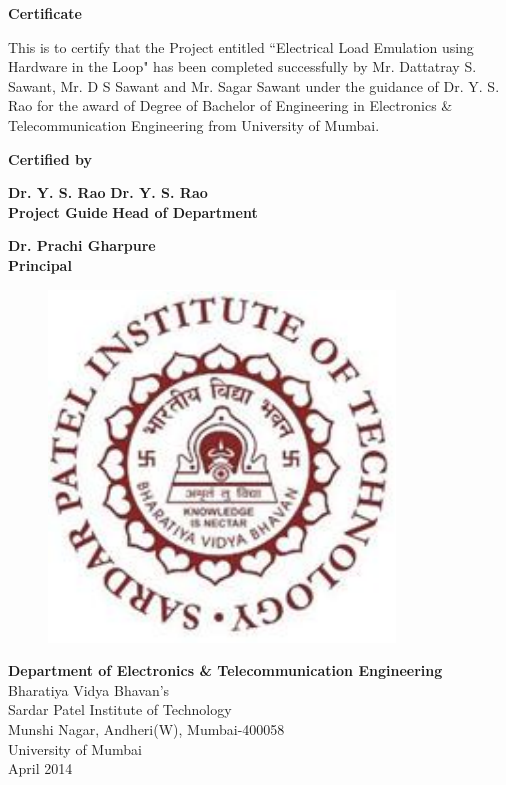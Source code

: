 \thispagestyle{empty}
\vspace*{0.2cm}
\vspace{1cm}
\begin{center}
\large\textbf{Certificate}
\end{center}
\vspace{1cm}
This is to certify that the Project entitled ``Electrical Load Emulation using Hardware in the Loop" has been completed successfully by Mr. Dattatray S. Sawant, Mr. D S Sawant and Mr. Sagar Sawant under the guidance of Dr. Y. S. Rao for the award of Degree of Bachelor of Engineering in Electronics \& Telecommunication Engineering from University of Mumbai.\\
\vspace{1cm}
\begin{center}
\textbf{Certified by}
\end{center}
\vspace{1cm}


\textbf {Dr. Y. S. Rao} \hspace{3.6in} \textbf{Dr. Y. S. Rao   }\\ \hspace*{0.5cm}
\textbf {Project Guide} \hspace{3.3in} \textbf{Head of Department} \\
\vspace{1cm}
 

\begin{center}
\textbf{Dr. Prachi Gharpure}\\
\textbf{Principal}
\end{center}
 
\begin{figure}[h]
\centering
\includegraphics[scale=0.8]{spitlogo.pdf}

\end{figure}
\hspace{.05cm}
\hspace{.05cm}
 
\begin{center}
\textbf {Department of Electronics \& Telecommunication Engineering}\\
Bharatiya  Vidya Bhavan's\\
Sardar Patel Institute of Technology\\
Munshi Nagar, Andheri(W), Mumbai-400058\\
University of Mumbai\\
April 2014\\
\end{center}

